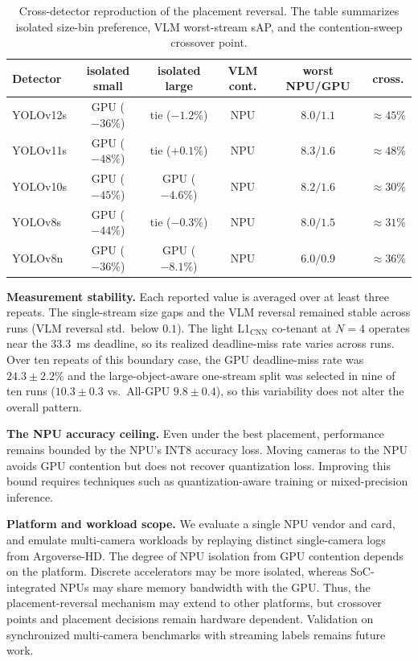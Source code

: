 \documentclass[runningheads]{llncs}
\newcommand{\Lcnn}{L1$_{\text{CNN}}$}
\begin{document}
\begin{table}[tb]
\centering
\caption{Cross-detector reproduction of the placement reversal. The table summarizes isolated size-bin preference, VLM worst-stream sAP, and the contention-sweep crossover point.}
\label{tab:detector-generality}
\footnotesize
\setlength{\tabcolsep}{4pt}
\begin{tabular}{lccccc}
\toprule
Detector & isolated small & isolated large & VLM cont. & worst NPU/GPU & cross. \\
\midrule
YOLOv12s  & GPU ($-36\%$) & tie ($-1.2\%$) & NPU & $8.0/1.1$ & $\approx45\%$ \\
YOLOv11s & GPU ($-48\%$) & tie ($+0.1\%$) & NPU & $8.3/1.6$ & $\approx48\%$ \\
YOLOv10s & GPU ($-45\%$) & GPU ($-4.6\%$) & NPU & $8.2/1.6$ & $\approx30\%$ \\
YOLOv8s  & GPU ($-44\%$) & tie ($-0.3\%$) & NPU & $8.0/1.5$ & $\approx31\%$ \\
YOLOv8n  & GPU ($-36\%$) & GPU ($-8.1\%$) & NPU & $6.0/0.9$ & $\approx36\%$ \\
\bottomrule
\end{tabular}
\end{table}

\noindent\textbf{Measurement stability.}
Each reported value is averaged over at least three repeats. The single-stream size gaps and the VLM reversal remained stable across runs (VLM reversal std.\ below $0.1$). The light \Lcnn{} co-tenant at $N{=}4$ operates near the $33.3$~ms deadline, so its realized deadline-miss rate varies across runs. Over ten repeats of this boundary case, the GPU deadline-miss rate was $24.3 \pm 2.2\%$ and the large-object-aware one-stream split was selected in nine of ten runs ($10.3 \pm 0.3$ vs.\ All-GPU $9.8 \pm 0.4$), so this variability does not alter the overall pattern.

\noindent\textbf{The NPU accuracy ceiling.}
Even under the best placement, performance remains bounded by the NPU's INT8 accuracy loss. Moving cameras to the NPU avoids GPU contention but does not recover quantization loss. Improving this bound requires techniques such as quantization-aware training or mixed-precision inference.

\noindent\textbf{Platform and workload scope.}
We evaluate a single NPU vendor and card, and emulate multi-camera workloads by replaying distinct single-camera logs from Argoverse-HD. The degree of NPU isolation from GPU contention depends on the platform. Discrete accelerators may be more isolated, whereas SoC-integrated NPUs may share memory bandwidth with the GPU. Thus, the placement-reversal mechanism may extend to other platforms, but crossover points and placement decisions remain hardware dependent. Validation on synchronized multi-camera benchmarks with streaming labels remains future work.
\end{document}
